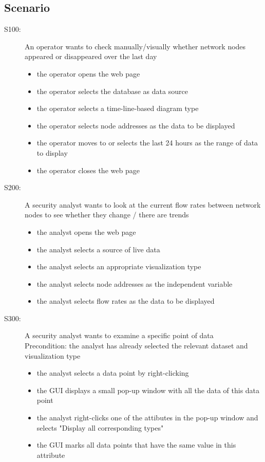\documentclass[twoside, english, draft]{Pflichtenheft}
\begin{document}
\subsection{Scenario}

\begin{description}
\item[S100:] An operator wants to check manually/visually whether network nodes appeared or disappeared over the last day
\begin{itemize}
\item{the operator opens the web page}
\item{the operator selects the database as data source}
\item{the operator selects a time-line-based \gls{diagram type}}
\item{the operator selects node addresses as the data to be displayed}
\item{the operator moves to or selects the last 24 hours as the range of data to display}
\item{the operator closes the web page}
  \end{itemize}



\item[S200:] A security analyst wants to look at the current flow rates between network nodes to see whether they change / there are trends
\begin{itemize}
\item{the analyst opens the web page}
\item{the analyst selects a source of live data}
\item{the analyst selects an appropriate visualization type}
\item{the analyst selects node addresses as the independent variable}
\item{the analyst selects flow rates as the data to be displayed}
\end{itemize}



\item[S300:] A security analyst wants to examine a specific point of data
\\
Precondition: the analyst has already selected the relevant dataset and visualization type
\begin{itemize}
\item{the analyst selects a data point by right-clicking}
\item{the GUI displays a small pop-up window with all the data of this data point}
\item{the analyst right-clicks one of the attibutes in the pop-up window and selects "Display all corresponding types"}
\item{the GUI marks all data points that have the same value in this attribute}
\end{itemize}




\end{description}
\end{document}
